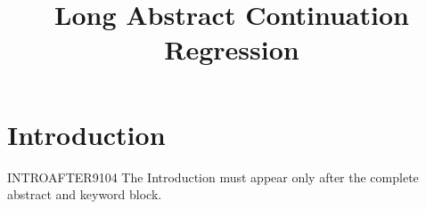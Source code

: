 \documentclass{tnqjournal}
\title{Long Abstract Continuation Regression}
\begin{document}
\maketitle
\section{Introduction}
INTROAFTER9104 The Introduction must appear only after the complete abstract and keyword block.
\end{document}
